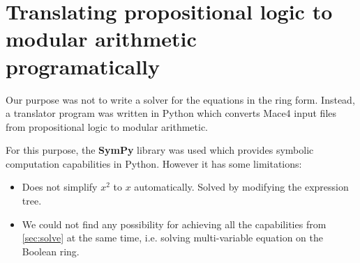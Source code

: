 \section{Translating propositional logic to modular arithmetic programatically}

Our purpose was not to write a solver for the equations in the ring form. Instead, a translator program was written in Python which converts Mace4 input files from propositional logic to modular arithmetic.

For this purpose, the \textbf{SymPy} library was used which provides symbolic computation capabilities in Python. However it has some limitations: 

\begin{itemize}
\item Does not simplify $x^2$ to $x$ automatically. Solved by modifying the expression tree.
\item We could not find any possibility for achieving all the capabilities from \ref{sec:solve} at the same time, i.e. solving multi-variable equation on the Boolean ring.
\end{itemize}

